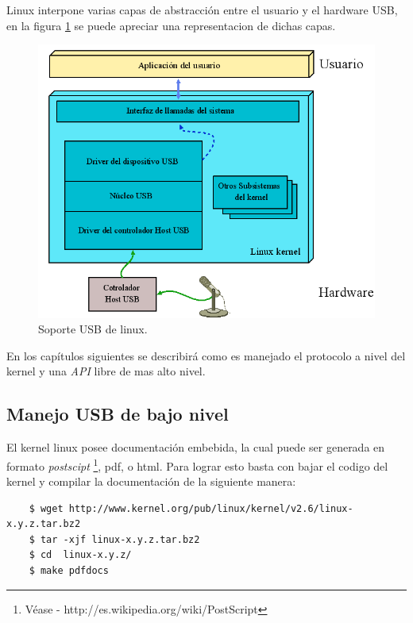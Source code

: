 Linux interpone varias capas de abstracci\'on entre el usuario y el hardware
USB, en la figura \ref{fig:usb_linux_layers} se puede apreciar una
representacion de dichas capas.

\begin{figure}
\centering
\includegraphics[scale=0.5]{./img/usb_linux_layers.png}
\caption{Soporte USB de linux.}
\label{fig:usb_linux_layers}
\end{figure}


En los cap\'itulos siguientes se describir\'a como es
manejado el protocolo a nivel del kernel y una \emph{API} libre de mas alto
nivel.

\subsection{Manejo USB de bajo nivel}

El kernel linux posee documentaci\'on embebida, la cual puede ser generada en
formato \emph{postscipt} \footnote{V\'ease -
http://es.wikipedia.org/wiki/PostScript}, pdf, o html. Para lograr esto basta
con bajar el codigo del kernel y compilar la documentaci\'on de la siguiente
manera:

\begin{scriptsize}
	\begin{verbatim}
	$ wget http://www.kernel.org/pub/linux/kernel/v2.6/linux-x.y.z.tar.bz2
	$ tar -xjf linux-x.y.z.tar.bz2
	$ cd  linux-x.y.z/
	$ make pdfdocs
	\end{verbatim}
\end{scriptsize}

